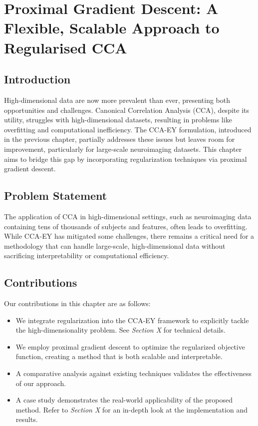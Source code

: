 \chapter{Proximal Gradient Descent: A Flexible, Scalable Approach to Regularised CCA}
\label{ch:proximal-gradient-descent}
\minitoc


\section{Introduction}

High-dimensional data are now more prevalent than ever, presenting both opportunities and challenges.
Canonical Correlation Analysis (CCA), despite its utility, struggles with high-dimensional datasets, resulting in problems like overfitting and computational inefficiency.
The CCA-EY formulation, introduced in the previous chapter, partially addresses these issues but leaves room for improvement, particularly for large-scale neuroimaging datasets.
This chapter aims to bridge this gap by incorporating regularization techniques via proximal gradient descent.

\section{Problem Statement}

The application of CCA in high-dimensional settings, such as neuroimaging data containing tens of thousands of subjects and features, often leads to overfitting.
While CCA-EY has mitigated some challenges, there remains a critical need for a methodology that can handle large-scale, high-dimensional data without sacrificing interpretability or computational efficiency.

\section{Contributions}

Our contributions in this chapter are as follows:

\begin{itemize}
    \item We integrate regularization into the CCA-EY framework to explicitly tackle the high-dimensionality problem. See \textit{Section X} for technical details.
    \item We employ proximal gradient descent to optimize the regularized objective function, creating a method that is both scalable and interpretable.
    \item A comparative analysis against existing techniques validates the effectiveness of our approach.
    \item A case study demonstrates the real-world applicability of the proposed method. Refer to \textit{Section X} for an in-depth look at the implementation and results.
\end{itemize}


